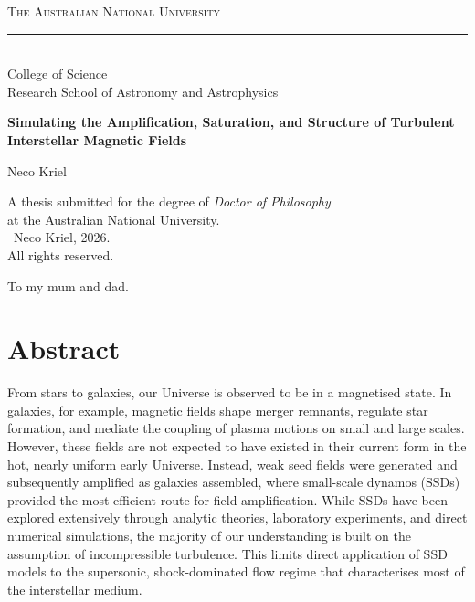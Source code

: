 \documentclass[12pt,twoside]{extreport}
\begin{document}
    \begin{titlepage}
        \centering

        {\Large\scshape The Australian National University}\\[-0.3cm]
        \rule{0.85\linewidth}{0.3pt}\\
        {\large College of Science}\\
        {\large Research School of Astronomy and Astrophysics}\\

        \vspace{5.0cm}

        {\Large\bfseries Simulating the Amplification, Saturation, and Structure of Turbulent Interstellar Magnetic Fields}

        \vspace{1.0cm}

        {\LARGE Neco Kriel}

        \vfill

        {A thesis submitted for the degree of \textit{Doctor of Philosophy}}\\[-0.2cm]
        {at the Australian National University.}\\
        {\textcopyright\ Neco Kriel, 2026.}\\[-0.2cm]
        {All rights reserved.}
\end{titlepage}


    \thispagestyle{empty}
    \vspace*{\fill}
    \begin{flushright}
        To my mum and dad.
    \end{flushright}
    \vspace*{\fill}
    \clearpage

    \setcounter{page}{1}

    \chapter*{Abstract}
\vspace{-0.5cm}

From stars to galaxies, our Universe is observed to be in a magnetised state. In galaxies, for example, magnetic fields shape merger remnants, regulate star formation, and mediate the coupling of plasma motions on small and large scales. However, these fields are not expected to have existed in their current form in the hot, nearly uniform early Universe. Instead, weak seed fields were generated and subsequently amplified as galaxies assembled, where small-scale dynamos (SSDs) provided the most efficient route for field amplification. While SSDs have been explored extensively through analytic theories, laboratory experiments, and direct numerical simulations, the majority of our understanding is built on the assumption of incompressible turbulence. This limits direct application of SSD models to the supersonic, shock-dominated flow regime that characterises most of the interstellar medium.
\end{document}
